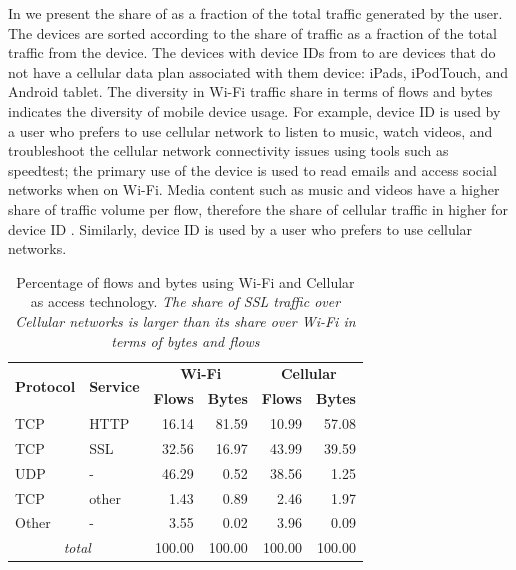 In  we present the share of \wifi as a fraction of the total traffic generated by the user.
The devices are sorted according to the share of \wifi traffic as a fraction of the total traffic from the device.  
The devices with device IDs from  to  are devices that do not have a cellular data plan associated with them device:  iPads,  iPodTouch, and  Android tablet.
The diversity in Wi-Fi traffic share in terms of flows and bytes indicates the diversity of mobile device usage. 
For example, device ID  is used by a user who prefers to use cellular network to listen to music, watch videos, and troubleshoot the cellular network connectivity issues using tools such as speedtest; the primary use of the device is used to read emails and access social networks when on Wi-Fi. 
Media content such as music and videos have a higher share of traffic volume per flow, therefore the share of cellular traffic in higher for device ID . 
Similarly, device ID  is used by a user who prefers to use cellular networks. 

\begin{table}
\begin{center}
\begin{small}
\begin{tabular}{|l|l|r|r|r|r|}
\hline
\multirow{2}{*}{\bf Protocol} & \multirow{2}{*}{\bf Service} & \multicolumn{2}{|c|}{\bf Wi-Fi} & \multicolumn{2}{|c|}{\bf Cellular} \tabularnewline
\cline{3-6}
           &           &  \textbf{Flows}  &  \textbf{Bytes}  &  \textbf{Flows}  &  \textbf{Bytes}  \tabularnewline
\hline
 TCP       &  HTTP     &  16.14  &  81.59  &  10.99 &  57.08\tabularnewline
\hline
 TCP       &  SSL      &  32.56  &  16.97  &  43.99 &  39.59 \tabularnewline
\hline
UDP       &  -        &  46.29  &   0.52  &  38.56  &  1.25  \tabularnewline
\hline
TCP       &  other    &   1.43 &   0.89  &   2.46  &   1.97  \tabularnewline
\hline
Other     &  -        &   3.55 &  0.02  &   3.96 &   0.09  \tabularnewline
\hline
\multicolumn{2}{|c|}{\emph{total}} & 100.00 & 100.00 & 100.00 & 100.00 \tabularnewline
\hline
\end{tabular}
\end{small}
\end{center}
\caption{Percentage of flows and bytes using Wi-Fi and Cellular as access technology.  \emph{The share of SSL traffic over Cellular
    networks is larger than its share over Wi-Fi in terms of bytes and flows}}
\label{tab:summaryWifiCellularTraffic}
\end{table}


